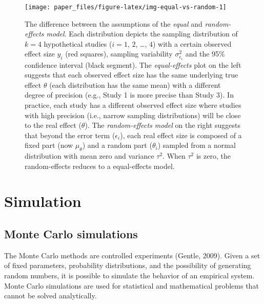 \documentclass[
  man,floatsintext]{apa6}
\begin{document}
\color{black}

\scriptsize

\begin{figure}[H]

{\centering \texttt{[image: paper\_files/figure-latex/img-equal-vs-random-1]} 

}

\caption{\color{red} The difference between the assumptions of the \emph{equal} and \emph{random-effects model}. Each distribution depicts the sampling distribution of \(k = 4\) hypothetical studies (\(i = 1\), \(2\), \ldots, \(4\)) with a certain observed effect size \(y_{i}\) (red squares), sampling variability \(\sigma_{\epsilon_i}^{2}\) and the 95\% confidence interval (black segment). The \emph{equal-effects} plot on the left suggests that each observed effect size has the same underlying true effect \(\theta\) (each distribution has the same mean) with a different degree of precision (e.g., Study 1 is more precise than Study 3). In practice, each study has a different observed effect size where studies with high precision (i.e., narrow sampling distributions) will be close to the real effect (\(\theta\)). The \emph{random-effects model} on the right suggests that beyond the error term (\(\epsilon_{i}\)), each real effect size is composed of a fixed part (now \(\mu_{\theta}\)) and a random part (\(\theta_{i}\)) sampled from a normal distribution with mean zero and variance \(\tau^{2}\). When \(\tau^{2}\) is zero, the random-effects reduces to a equal-effects model. \color{black}}\label{fig:img-equal-vs-random}
\end{figure}

\normalsize

\hypertarget{simulation}{%
\section{Simulation}\label{simulation}}

\hypertarget{monte-carlo-simulations}{%
\subsection{Monte Carlo simulations}\label{monte-carlo-simulations}}

The Monte Carlo methods are controlled experiments (Gentle, 2009). Given a set of fixed parameters, probability distributions, and the possibility of generating random numbers, it is possible to simulate the behavior of an empirical system. Monte Carlo simulations are used for statistical and mathematical problems that cannot be solved analytically.
\end{document}
